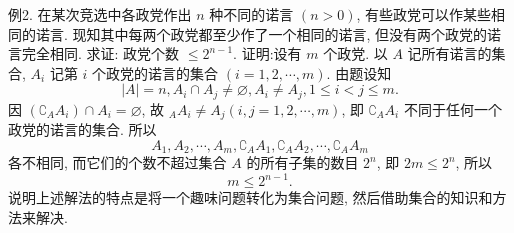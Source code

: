 例2. 在某次竞选中各政党作出 $n$ 种不同的诺言 $(n>0)$, 有些政党可以作某些相同的诺言.
现知其中每两个政党都至少作了一个相同的诺言, 但没有两个政党的诺言完全相同.
求证: 政党个数 $\leqslant 2^{n-1}$.
证明:设有 $m$ 个政党.
以 $A$ 记所有诺言的集合, $A_i$ 记第 $i$ 个政党的诺言的集合 $(i=1,2, \cdots, m)$. 由题设知
$$
|A|=n, A_i \cap A_j \neq \varnothing, A_i \neq A_j, 1 \leqslant i<j \leqslant m .
$$
因 $\left(\complement_A A_i\right) \cap A_i=\varnothing$, 故 ${ }_A A_i \neq A_j(i, j=1,2, \cdots, m)$, 即 $\complement_A A_i$ 不同于任何一个政党的诺言的集合.
所以
$$
A_1, A_2, \cdots, A_m, \complement_A A_1, \complement_A A_2, \cdots, \complement_A A_m
$$
各不相同, 而它们的个数不超过集合 $A$ 的所有子集的数目 $2^n$, 即 $2 m \leqslant 2^n$, 所以
$$
m \leqslant 2^{n-1} .
$$
说明上述解法的特点是将一个趣味问题转化为集合问题, 然后借助集合的知识和方法来解决.



